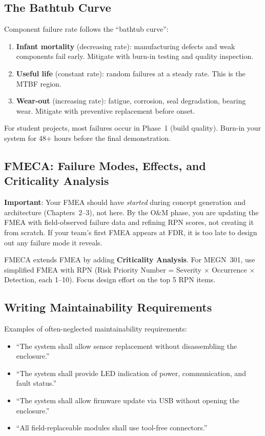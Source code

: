 \documentclass[11pt,letterpaper,twoside,openany]{book}
\begin{document}
\subsection{The Bathtub Curve}
Component failure rate follows the ``bathtub curve'':
\begin{enumerate}[nosep,leftmargin=1.5em]
\item \textbf{Infant mortality} (decreasing rate): manufacturing defects and weak components fail early. Mitigate with burn-in testing and quality inspection.
\item \textbf{Useful life} (constant rate): random failures at a steady rate. This is the MTBF region.
\item \textbf{Wear-out} (increasing rate): fatigue, corrosion, seal degradation, bearing wear. Mitigate with preventive replacement before onset.
\end{enumerate}
For student projects, most failures occur in Phase~1 (build quality). Burn-in your system for 48+ hours before the final demonstration.

\subsection{FMECA: Failure Modes, Effects, and Criticality Analysis}
\textbf{Important}: Your FMEA should have \emph{started} during concept generation and architecture (Chapters~2--3), not here. By the O\&M phase, you are updating the FMEA with field-observed failure data and refining RPN scores, not creating it from scratch. If your team's first FMEA appears at FDR, it is too late to design out any failure mode it reveals.

FMECA extends FMEA by adding \textbf{Criticality Analysis}. For MEGN~301, use simplified FMEA with RPN (Risk Priority Number = Severity $\times$ Occurrence $\times$ Detection, each 1--10). Focus design effort on the top 5 RPN items.

\subsection{Writing Maintainability Requirements}
Examples of often-neglected maintainability requirements:
\begin{itemize}[nosep,leftmargin=1.5em]
\item ``The system shall allow sensor replacement without disassembling the enclosure.''
\item ``The system shall provide LED indication of power, communication, and fault status.''
\item ``The system shall allow firmware update via USB without opening the enclosure.''
\item ``All field-replaceable modules shall use tool-free connectors.''
\end{itemize}
\end{document}
